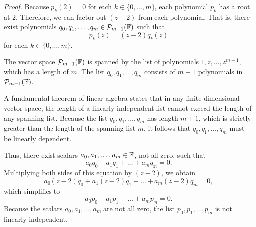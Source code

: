 \begin{proof}
	Because $p_k(2) = 0$ for each $k \in \{0, \dots, m\}$, each polynomial $p_k$ has a root at $2$. Therefore, we can factor out $(z - 2)$ from each polynomial. That is, there exist polynomials $q_0, q_1, \dots, q_m \in \mathcal{P}_{m-1}(\mathbb{F})$ such that
	\[
	p_k(z) = (z - 2)q_k(z)
	\]
	for each $k \in \{0, \dots, m\}$.
	
	The vector space $\mathcal{P}_{m-1}(\mathbb{F})$ is spanned by the list of polynomials $1, z, \dots, z^{m-1}$, which has a length of $m$. The list $q_0, q_1, \dots, q_m$ consists of $m+1$ polynomials in $\mathcal{P}_{m-1}(\mathbb{F})$. 
	
	A fundamental theorem of linear algebra states that in any finite-dimensional vector space, the length of a linearly independent list cannot exceed the length of any spanning list. Because the list $q_0, q_1, \dots, q_m$ has length $m+1$, which is strictly greater than the length of the spanning list $m$, it follows that $q_0, q_1, \dots, q_m$ must be linearly dependent.
	
	Thus, there exist scalars $a_0, a_1, \dots, a_m \in \mathbb{F}$, not all zero, such that
	\[
	a_0 q_0 + a_1 q_1 + \dots + a_m q_m = 0.
	\]
	Multiplying both sides of this equation by $(z - 2)$, we obtain
	\[
	a_0 (z - 2)q_0 + a_1 (z - 2)q_1 + \dots + a_m (z - 2)q_m = 0,
	\]
	which simplifies to
	\[
	a_0 p_0 + a_1 p_1 + \dots + a_m p_m = 0.
	\]
	Because the scalars $a_0, a_1, \dots, a_m$ are not all zero, the list $p_0, p_1, \dots, p_m$ is not linearly independent.
\end{proof}